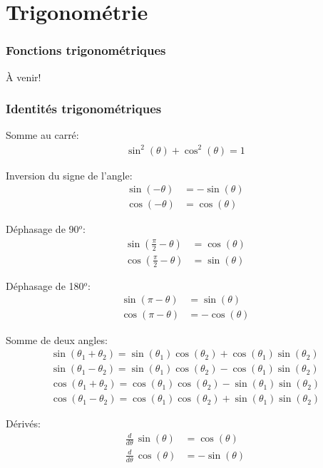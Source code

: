 \chapter{Trigonométrie}


\subsection{Fonctions trigonométriques}
À venir!



\subsection{Identités trigonométriques}


Somme au carré:
\begin{align}
\sin^2(\theta) + \cos^2(\theta) = 1
\end{align}

Inversion du signe de l'angle:
\begin{align}
\sin\left(- \theta \right) &= - \sin\left( \theta \right) \\
\cos\left(- \theta \right) &=   \cos\left( \theta \right) %
\end{align}

Déphasage de 90$^o$:
\begin{align}
\sin\left(\frac{\pi}{2} - \theta \right) &= \cos(\theta) \\
\cos\left(\frac{\pi}{2} - \theta \right) &= \sin(\theta) 
\end{align}

Déphasage de 180$^o$:
\begin{align}
\sin\left(\pi - \theta \right) &= \sin(\theta) \\
\cos\left(\pi - \theta \right) &= -\cos(\theta) 
\end{align}

Somme de deux angles:
\begin{align}
\sin\left(\theta_1 + \theta_2 \right) = \sin( \theta_1 ) \cos( \theta_2 ) + \cos( \theta_1 ) \sin( \theta_2 )
\\
\sin\left(\theta_1 - \theta_2 \right) = \sin( \theta_1 ) \cos( \theta_2 ) - \cos( \theta_1 ) \sin( \theta_2 )
\\
\cos\left(\theta_1 + \theta_2 \right) = \cos( \theta_1 ) \cos( \theta_2 ) - \sin( \theta_1 ) \sin( \theta_2 )
\\
\cos\left(\theta_1 - \theta_2 \right) = \cos( \theta_1 ) \cos( \theta_2 ) + \sin( \theta_1 ) \sin( \theta_2 ) 
\end{align}

Dérivés:
\begin{align}
\frac{d}{d\theta} \, \sin\left(\theta \right) &= \cos(\theta) \\
\frac{d}{d\theta} \, \cos\left(\theta \right) &= -\sin(\theta) 
\end{align}

